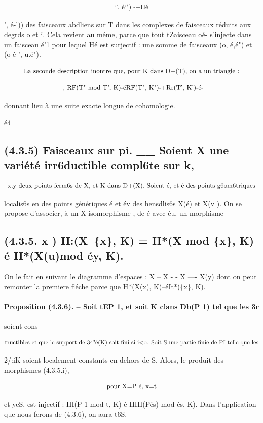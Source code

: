 \documentclass[11pt]{article}
\theoremstyle{remark}
\begin{document}
\[\text{\small '', é'") -+Hé}\]

', é-')) des faisceaux abdliens sur T dans les complexes de faisceaux réduits aux degrds o et i. Cela revient au méme, parce que tout tZaisceau oé- s'injecte dans un faisceau é'1 pour lequel Hé est surjectif : une somme de faisceaux (o, é,é") et (o é-', u.é").

\[\text{\small La seconde description inontre que, pour K dans D+(T), on a un triangle :}\]

\[\text{\small --, RF(T" mod T', K)-éRF(T", K")-+Rr(T', K')-é-}\]

donnant lieu à une suite exacte longue de cohomologie.

é4

\subsection*{(4.3.5) Faisceaux sur pi. \_\_ Soient X une variété irr6ductible compl6te sur k,}

\[\text{\small x,y deux points ferm6s de X, et K dans D+(X). Soient é, et é des points g6om6triques}\]

localis6s en des points génériques é et év des hensdlis6s X(é) et X(v ). On se propose d'associer, à un X-isomorphisme , de é avec éu, un morphisme

\subsection*{(4.3.5. x ) H:(X--\{x\}, K) = H*(X mod \{x\}, K) é H*(X(u)mod éy, K).}

On le fait en suivant le diagramme d'espaces : X -- X - - X ---- X(y) dont on peut remonter la premiere fléche parce que H*(X(x), K)--éIt*(\{x\}, K).

\paragraph{Proposition (4.3.6). -- Soit tEP 1, et soit K clans Db(P 1) tel que les 3r}

soient cons-

\[\text{\small tructibles et que le support de 34"é(K) soit fini si i<o. Soit S une partie finie de PI telle que les}\]

2/:iK soient localement constants en dehors de S. Alors, le produit des morphismes (4.3.5.i),

\[\text{\small pour X=P é, x=t}\]

et yeS, est injectif : HI(P 1 mod t, K) é IIHI(Pés) mod és, K). Dans l'applieation que nous ferons de (4.3.6), on aura t6S.
\end{document}
